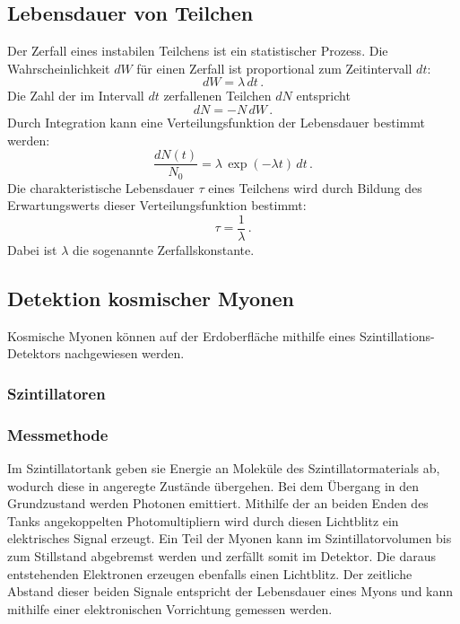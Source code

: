 \subsection{Lebensdauer von Teilchen}
Der Zerfall eines instabilen Teilchens ist ein statistischer Prozess. Die Wahrscheinlichkeit $dW$ für einen Zerfall ist proportional zum Zeitintervall $dt$:
\begin{equation*}
    dW = \lambda \, dt \, .
\end{equation*}
Die Zahl der im Intervall $dt$ zerfallenen Teilchen $dN$ entspricht
\begin{equation*}
    dN = - N \, dW \, .
\end{equation*}
Durch Integration kann eine Verteilungsfunktion der Lebensdauer bestimmt werden:
\begin{equation}
    \frac{dN(t)}{N_0} = \lambda \, \exp(- \lambda t) \, dt \, .
    \label{eq:verteilung}
\end{equation}
Die charakteristische Lebensdauer $\tau$ eines Teilchens wird durch Bildung des Erwartungswerts dieser Verteilungsfunktion bestimmt:
\begin{equation}
    \tau = \frac{1}{\lambda} \, .
    \label{eq:tau}
\end{equation}
Dabei ist $\lambda$ die sogenannte Zerfallskonstante.


\subsection{Detektion kosmischer Myonen}

Kosmische Myonen können auf der Erdoberfläche mithilfe eines Szintillations-Detektors nachgewiesen werden. 

\subsubsection{Szintillatoren}

\subsubsection{Messmethode}
Im Szintillatortank geben sie Energie an Moleküle des Szintillatormaterials ab, wodurch diese in angeregte Zustände übergehen. Bei dem Übergang in den Grundzustand werden Photonen emittiert. Mithilfe der an beiden Enden des Tanks angekoppelten Photomultipliern wird durch diesen Lichtblitz  ein elektrisches Signal erzeugt. Ein Teil der Myonen kann im Szintillatorvolumen bis zum Stillstand abgebremst werden und zerfällt somit im Detektor. Die daraus entstehenden Elektronen erzeugen ebenfalls einen Lichtblitz. Der zeitliche Abstand dieser beiden Signale entspricht der Lebensdauer eines Myons und kann mithilfe einer elektronischen Vorrichtung gemessen werden.

